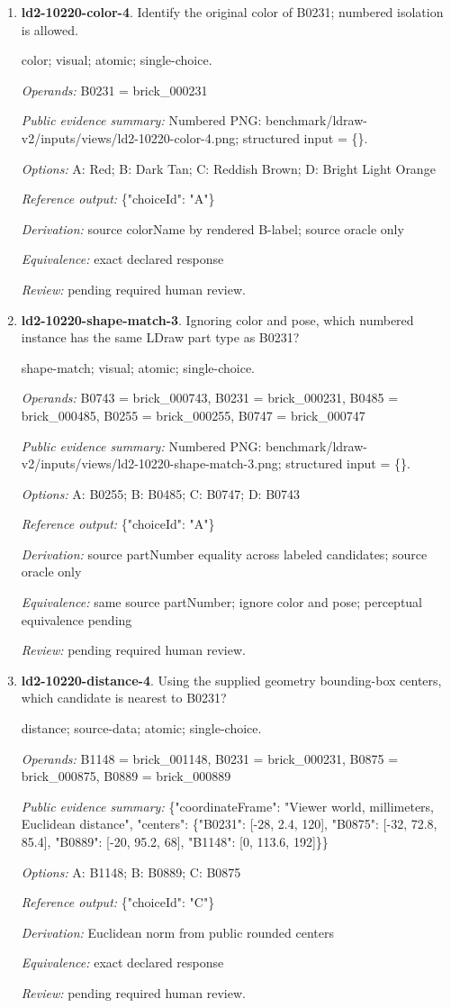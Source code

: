 \begin{enumerate}
\item \textbf{ld2-10220-color-4}. Identify the original color of B0231; numbered isolation is allowed.
\par{\small color; visual; atomic; single-choice.\par\textit{Operands:} B0231 = brick\_000231\par\textit{Public evidence summary:} Numbered PNG: benchmark/ldraw-v2/inputs/views/ld2-10220-color-4.png; structured input = \{\}.\par\textit{Options:} A: Red; B: Dark Tan; C: Reddish Brown; D: Bright Light Orange\par\textit{Reference output:} \{"choiceId": "A"\}\par\textit{Derivation:} source colorName by rendered B-label; source oracle only\par\textit{Equivalence:} exact declared response\par\textit{Review:} pending required human review.}
\item \textbf{ld2-10220-shape-match-3}. Ignoring color and pose, which numbered instance has the same LDraw part type as B0231?
\par{\small shape-match; visual; atomic; single-choice.\par\textit{Operands:} B0743 = brick\_000743, B0231 = brick\_000231, B0485 = brick\_000485, B0255 = brick\_000255, B0747 = brick\_000747\par\textit{Public evidence summary:} Numbered PNG: benchmark/ldraw-v2/inputs/views/ld2-10220-shape-match-3.png; structured input = \{\}.\par\textit{Options:} A: B0255; B: B0485; C: B0747; D: B0743\par\textit{Reference output:} \{"choiceId": "A"\}\par\textit{Derivation:} source partNumber equality across labeled candidates; source oracle only\par\textit{Equivalence:} same source partNumber; ignore color and pose; perceptual equivalence pending\par\textit{Review:} pending required human review.}
\item \textbf{ld2-10220-distance-4}. Using the supplied geometry bounding-box centers, which candidate is nearest to B0231?
\par{\small distance; source-data; atomic; single-choice.\par\textit{Operands:} B1148 = brick\_001148, B0231 = brick\_000231, B0875 = brick\_000875, B0889 = brick\_000889\par\textit{Public evidence summary:} \{"coordinateFrame": "Viewer world, millimeters, Euclidean distance", "centers": \{"B0231": [-28, 2.4, 120], "B0875": [-32, 72.8, 85.4], "B0889": [-20, 95.2, 68], "B1148": [0, 113.6, 192]\}\}\par\textit{Options:} A: B1148; B: B0889; C: B0875\par\textit{Reference output:} \{"choiceId": "C"\}\par\textit{Derivation:} Euclidean norm from public rounded centers\par\textit{Equivalence:} exact declared response\par\textit{Review:} pending required human review.}

\end{enumerate}
